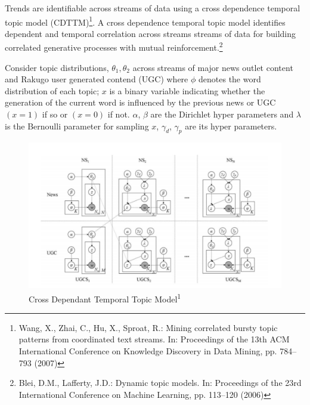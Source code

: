 \documentclass{article}
\begin{document}
Trends are identifiable across streams of data using a cross dependence temporal topic model (CDTTM)\footnote{Wang, X., Zhai, C., Hu, X., Sproat, R.: Mining correlated bursty topic patterns from coordinated text streams. In: Proceedings of the 13th ACM International Conference on Knowledge Discovery in Data Mining, pp. 784–793 (2007)}. A cross dependence temporal topic model identifies dependent and temporal correlation across streams streams of data for building correlated generative processes with mutual reinforcement.\footnote{Blei, D.M., Lafferty, J.D.: Dynamic topic models. In: Proceedings of the 23rd International Conference on Machine Learning, pp. 113–120 (2006)}

Consider topic distributions, \begin{math} \theta_1, \theta_2 \end{math} across streams of major news outlet content and Rakugo user generated contend (UGC) where \begin{math} \phi \end{math} denotes the word distribution of each topic; \begin{math} x \end{math} is a binary variable indicating whether the generation of the current word is influenced by
the previous news or UGC \begin{math} (x = 1) \end{math} if so or \begin{math} (x = 0) \end{math} if not. \begin{math} \alpha \end{math}, \begin{math} \beta \end{math} are the Dirichlet hyper
parameters and \begin{math} \lambda \end{math} is the Bernoulli parameter for sampling \begin{math} x \end{math}, \begin{math} \gamma_d \end{math}, \begin{math} \gamma_p \end{math} are its hyper
parameters.

\begin{figure}[H]
\centering
\includegraphics[scale=0.4]{CDTTM2.png}
\caption{Cross Dependant Temporal Topic Model\textsuperscript{1}}
\end{figure}
\end{document}
